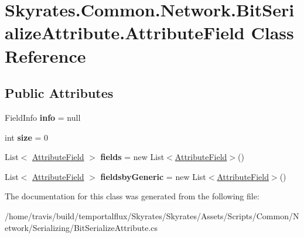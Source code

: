 \hypertarget{class_skyrates_1_1_common_1_1_network_1_1_bit_serialize_attribute_1_1_attribute_field}{\section{Skyrates.\-Common.\-Network.\-Bit\-Serialize\-Attribute.\-Attribute\-Field Class Reference}
\label{class_skyrates_1_1_common_1_1_network_1_1_bit_serialize_attribute_1_1_attribute_field}
}
\subsection*{Public Attributes}
\begin{DoxyCompactItemize}
\item 
\hypertarget{class_skyrates_1_1_common_1_1_network_1_1_bit_serialize_attribute_1_1_attribute_field_ae9cee5bd3d27d3de81812830350b2ed8}{Field\-Info {\bfseries info} = null}\label{class_skyrates_1_1_common_1_1_network_1_1_bit_serialize_attribute_1_1_attribute_field_ae9cee5bd3d27d3de81812830350b2ed8}

\item 
\hypertarget{class_skyrates_1_1_common_1_1_network_1_1_bit_serialize_attribute_1_1_attribute_field_a7e1e751a12a8dac9d2aaf727542d5b89}{int {\bfseries size} = 0}\label{class_skyrates_1_1_common_1_1_network_1_1_bit_serialize_attribute_1_1_attribute_field_a7e1e751a12a8dac9d2aaf727542d5b89}

\item 
\hypertarget{class_skyrates_1_1_common_1_1_network_1_1_bit_serialize_attribute_1_1_attribute_field_a68bcbefee23798f09c327c4b69e26829}{List$<$ \hyperlink{class_skyrates_1_1_common_1_1_network_1_1_bit_serialize_attribute_1_1_attribute_field}{Attribute\-Field} $>$ {\bfseries fields} = new List$<$\hyperlink{class_skyrates_1_1_common_1_1_network_1_1_bit_serialize_attribute_1_1_attribute_field}{Attribute\-Field}$>$()}\label{class_skyrates_1_1_common_1_1_network_1_1_bit_serialize_attribute_1_1_attribute_field_a68bcbefee23798f09c327c4b69e26829}

\item 
\hypertarget{class_skyrates_1_1_common_1_1_network_1_1_bit_serialize_attribute_1_1_attribute_field_a44a7ec30e76486e3d71b5afc72a5408c}{List$<$ \hyperlink{class_skyrates_1_1_common_1_1_network_1_1_bit_serialize_attribute_1_1_attribute_field}{Attribute\-Field} $>$ {\bfseries fieldsby\-Generic} = new List$<$\hyperlink{class_skyrates_1_1_common_1_1_network_1_1_bit_serialize_attribute_1_1_attribute_field}{Attribute\-Field}$>$()}\label{class_skyrates_1_1_common_1_1_network_1_1_bit_serialize_attribute_1_1_attribute_field_a44a7ec30e76486e3d71b5afc72a5408c}

\end{DoxyCompactItemize}


The documentation for this class was generated from the following file\-:\begin{DoxyCompactItemize}
\item 
/home/travis/build/temportalflux/\-Skyrates/\-Skyrates/\-Assets/\-Scripts/\-Common/\-Network/\-Serializing/Bit\-Serialize\-Attribute.\-cs\end{DoxyCompactItemize}
